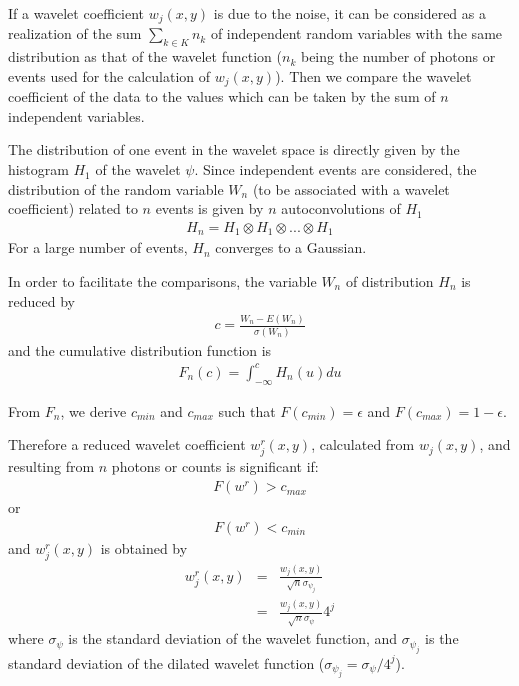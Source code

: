 If a wavelet coefficient $w_j(x,y)$ is due to the noise, it can be considered
as a realization of the sum $\sum_{k \in K} n_k$ of 
independent random variables 
with the same distribution as that of the wavelet function ($n_k$
being the number of photons or events used for the calculation of $w_j(x,y)$).
Then we compare the wavelet coefficient of the data to the values 
which can be taken by the sum of $n$ independent variables.

The distribution of one event in the wavelet space is directly 
given by the histogram $H_1$ of the wavelet $\psi$. Since 
independent events are considered, the distribution of the random variable 
$W_n$ (to be associated with a wavelet coefficient) related to $n$
events is given by $n$ autoconvolutions of $H_1$
\begin{eqnarray}
H_n = H_1 \otimes  H_1 \otimes ... \otimes H_1
\end{eqnarray}
For a large number of events, $H_n$ converges to a Gaussian. 

In order to facilitate the comparisons, the variable $W_n$ of distribution
 $H_n$ 
 is reduced by
\begin{eqnarray}
c = \frac{W_n - E(W_n)}{\sigma(W_n)}
\end{eqnarray}
and the cumulative distribution  function is 
\begin{eqnarray}
F_n(c) = \int_{-\infty}^{c} H_n(u) du
\end{eqnarray}

From $F_n$, we derive $c_{min}$ and $c_{max}$ such 
that $F(c_{min}) = \epsilon$
and $F(c_{max}) = 1 - \epsilon$.

Therefore a reduced wavelet coefficient $w^r_j(x,y)$, calculated from
$w_j(x,y)$, and  resulting 
from $n$ photons or counts is
significant if:
\begin{eqnarray}
F(w^r) > c_{max}
\end{eqnarray}
or
\begin{eqnarray}
F(w^r) < c_{min}
\end{eqnarray}
and $w^r_j(x,y)$ is obtained by
\begin{eqnarray}
w^r_j(x,y)  & = &   \frac{w_j(x,y)}{\sqrt{n} \sigma_{\psi_j}} \\
             & =  & \frac{w_j(x,y)}{\sqrt{n} \sigma_{\psi}} 4^j
\end{eqnarray}
where $\sigma_{\psi}$ is the standard deviation of the wavelet function, and
$\sigma_{\psi_j}$ is the standard deviation of the dilated wavelet function
($\sigma_{\psi_j} = \sigma_{\psi}/4^j$).


